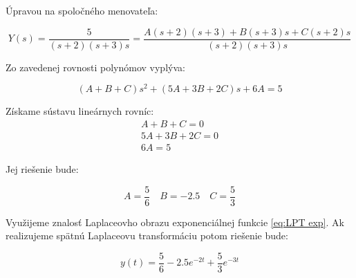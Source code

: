 \documentclass[a4paper,10pt]{article}
\begin{document}
Úpravou na spoločného menovateľa:

\begin{equation*}
Y(s)=\frac{5}{(s+2)(s+3)s}=\frac{A(s+2)(s+3)+B(s+3)s+C(s+2)s}{(s+2)(s+3)s}
\end{equation*}

Zo zavedenej rovnosti polynómov vyplýva:

\begin{equation*}
\left(A+B+C\right)s^2+\left(5A+3B+2C\right)s+6A=5
\end{equation*}

Získame sústavu lineárnych rovníc:
\begin{equation*}
\begin{array}{c}
	A+B+C=0 \\
	5A+3B+2C=0\\
	6A=5
\end{array}
\end{equation*}

Jej riešenie bude:

\begin{equation*}
A=\frac{5}{6} \quad B=-2.5 \quad C=\frac{5}{3}  
\end{equation*}

Využijeme znalosť Laplaceovho obrazu exponenciálnej funkcie \eqref{eq:LPT exp}.
Ak realizujeme spätnú Laplaceovu transformáciu potom riešenie bude:

\begin{equation*}
y(t)=\frac{5}{6}-2.5e^{-2t}+\frac{5}{3}e^{-3t}
\end{equation*}
\end{document}
